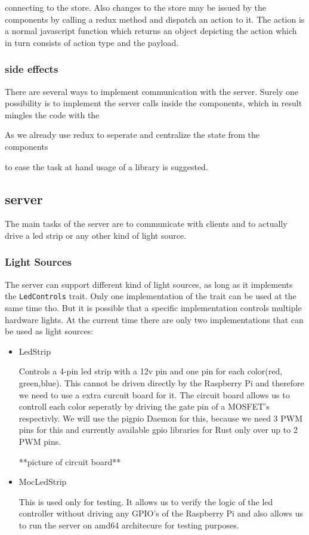 \documentclass[conference]{IEEEtran}
\begin{document}
connecting to the store. Also changes to the store may be issued by the components by calling a redux method and dispatch an action to it.
The action is a normal javascript function which returns an object depicting the action which in turn consists of action type and the payload.

\subsubsection{side effects}
There are several ways to implement communication with the server. Surely one possibility is to implement the server calls inside the components,
which in result mingles the code with the 


As we already use redux to seperate and centralize the state from the components


to ease the task at hand usage of a library is suggested. 



\subsection{server}
The main tasks of the server are to communicate with clients and to actually drive a 
led strip or any other kind of light source.

\subsubsection{Light Sources}

The server can support different kind of light sources, as long as it implements the \texttt{LedControls} trait.
Only one implementation of the trait can be used at the same time tho. But it is possible that a specific implementation
controls multiple hardware lights. At the current time there are only two implementations that can be used as light
sources:

\begin{itemize}
    \item LedStrip
    
    Controls a 4-pin led strip with a 12v pin and one pin for each color(red, green,blue). This cannot be driven 
    directly by the Raspberry Pi and therefore we need to use a extra curcuit board\cite{b0} for it. The circuit
    board allows us to controll each color seperatly by driving the gate pin of a MOSFET's respectivly. We will use 
    the pigpio Daemon\cite{b1} for this, because we need 3 PWM pins for this and currently available gpio libraries 
    for Rust only over up to 2 PWM pins.
    
    **picture of circuit board**

    \item MocLedStrip
    
    This is used only for testing. It allows us to verify the logic of the led controller without driving any
    GPIO's of the Raspberry Pi and also allows us to run the server on amd64 architecure for testing purposes.
\end{itemize}
\end{document}
